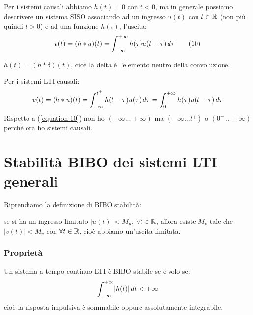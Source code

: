 	Per i sistemi causali abbiamo $h(t) =0$ con $ t<0$, ma in generale possiamo descrivere un sistema SISO associando ad un ingresso $u(t)$ con $ t \in \mathbb{R}$ (non più quindi $t>0$) e ad una funzione $h(t)$, l'uscita:
	\begin{equation}
		v(t)=(h*u)(t) = \int_{-\infty}^{+\infty}h(\tau)u(t-\tau)\, d\tau
		\tag{10}\label{equation 10}
	\end{equation}
	
	\begin{NB}
	$h(t)=(h* \delta )(t)$, cioè la delta è l'elemento neutro della convoluzione.
	\end{NB}	

	Per i sistemi LTI causali:
	\[
		v(t)=(h*u)(t) = \int_{-\infty}^{t^+}h(t-\tau)u(\tau)\, d\tau = \int_{0^-}^{+\infty}h(\tau)u(t-\tau)\, d\tau
	\]
	Rispetto a (\ref{equation 10}) non ho $ (-\infty...+\infty)$ ma $ (-\infty...t^+)$ o $ (0^-...+\infty)$ perchè ora ho sistemi causali.

	
\section{Stabilità BIBO dei sistemi LTI generali}
	\label{sec:BIBO}
	
	Riprendiamo la definizione di BIBO stabilità:
	
	se si ha un ingresso limitato $ | u(t) |  < M_u$, $ \forall t \in \mathbb{R}$,	allora esiste $ M_v $ tale che $| v(t) | < M_v $ con $ \forall t \in \mathbb{R} $, cioè abbiamo un'uscita limitata.
	
	\subsubsection{Proprietà}
	Un sistema a tempo continuo LTI è BIBO stabile se e solo se:
	\[
		\int_{-\infty}^{+\infty}\lvert h(t) \rvert \, d t < +\infty
	\]
	cioè la risposta impulsiva è sommabile oppure assolutamente integrabile.
	

